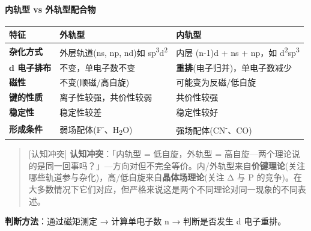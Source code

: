 \paragraph{内轨型 vs 外轨型配合物}\label{ux5185ux8f68ux578b-vs-ux5916ux8f68ux578bux914dux5408ux7269}

{\def\LTcaptype{none} %
\begin{longtable}[]{@{}
  >{\raggedright\arraybackslash}p{}
  >{\raggedright\arraybackslash}p{}
  >{\raggedright\arraybackslash}p{}@{}}
\toprule\noalign{}
\begin{minipage}[b]{\linewidth}\raggedright
特征
\end{minipage} & \begin{minipage}[b]{\linewidth}\raggedright
外轨型
\end{minipage} & \begin{minipage}[b]{\linewidth}\raggedright
内轨型
\end{minipage} \\
\midrule\noalign{}
\endhead
\bottomrule\noalign{}
\endlastfoot
\textbf{杂化方式} & 外层轨道(ns, np, nd)如 sp\textsuperscript{3}d\textsuperscript{2} & 内层 (n-1)d + ns + np，如 d\textsuperscript{2}sp\textsuperscript{3} \\
\textbf{d 电子排布} & 不变，单电子数不变 & \textbf{重排}(电子归并)，单电子数减少 \\
\textbf{磁性} & 不变(顺磁/高自旋) & 可能变为反磁/低自旋 \\
\textbf{键的性质} & 离子性较强，共价性较弱 & 共价性较强 \\
\textbf{稳定性} & 稳定性较差 & 稳定性较好 \\
\textbf{形成条件} & 弱场配体(F\textsuperscript{-}、H\textsubscript{2}O) & 强场配体(CN\textsuperscript{-}、CO) \\
\end{longtable}
}

\begin{quote}
{[}认知冲突{]} \textbf{认知冲突}：「内轨型 = 低自旋，外轨型 = 高自旋---两个理论说的是同一回事吗？」---方向对但不完全等价。内/外轨型来自\textbf{价键理论}(关注哪些轨道参与杂化)，高/低自旋来自\textbf{晶体场理论}(关注 Δ 与 P 的竞争)。在大多数情况下它们对应，但严格来说这是两个不同理论对同一现象的不同表述。
\end{quote}

\textbf{判断方法}：通过磁矩测定 → 计算单电子数 n → 判断是否发生 d 电子重排。

